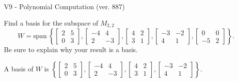 \begin{exercise}
  \begin{exerciseTitle}V9 - Polynomial Computation (ver. 887)\end{exerciseTitle}
  \begin{exerciseStatement}
    Find a basis for the subspace of \(M_{2,2}\) 
\[W=\mathrm{span}\ \left\{\left[\begin{array}{cc}
2 & 5 \\
0 & 3
\end{array}\right] , \left[\begin{array}{cc}
-4 & 4 \\
2 & -3
\end{array}\right] , \left[\begin{array}{cc}
4 & 2 \\
3 & 1
\end{array}\right] , \left[\begin{array}{cc}
-3 & -2 \\
4 & 1
\end{array}\right] , \left[\begin{array}{cc}
0 & 0 \\
-5 & 2
\end{array}\right]\right\}.\]
 Be sure to explain why your result is a basis.


  \end{exerciseStatement}
  \begin{exerciseAnswer}
   A basis of \(W\) is  \(\left\{\left[\begin{array}{cc}
2 & 5 \\
0 & 3
\end{array}\right] , \left[\begin{array}{cc}
-4 & 4 \\
2 & -3
\end{array}\right] , \left[\begin{array}{cc}
4 & 2 \\
3 & 1
\end{array}\right] , \left[\begin{array}{cc}
-3 & -2 \\
4 & 1
\end{array}\right]\right\}\).
  


  \end{exerciseAnswer}
\end{exercise}